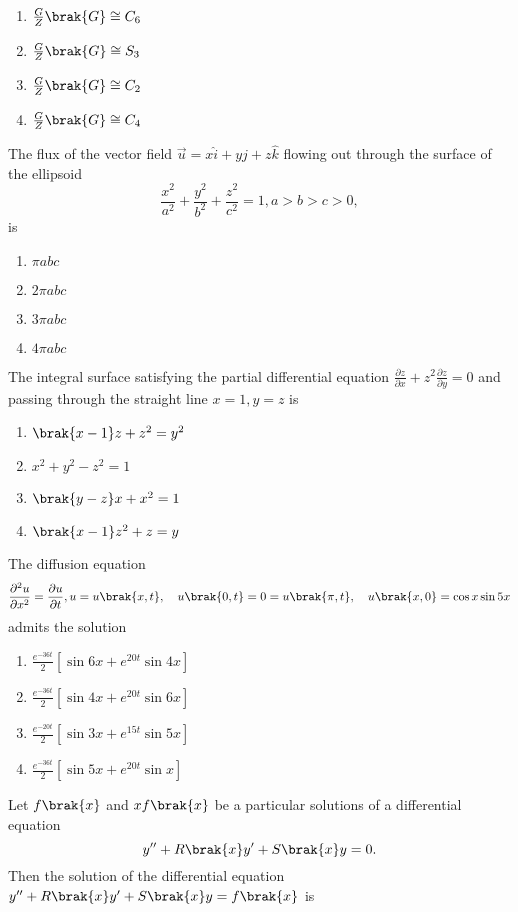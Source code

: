     \begin{enumerate}
        \item $\frac{G}{Z}\brak{G}\cong C_6$
         \item $\frac{G}{Z}\brak{G}\cong S_3$
          \item $\frac{G}{Z}\brak{G}\cong C_2$
          \item $\frac{G}{Z}\brak{G}\cong C_4$ 
    \end{enumerate}
    \item The flux of the vector field $\vec{u}=x\hat{i}+y\hat{j}+z\hat{k}$ flowing out through the surface of the ellipsoid $$\frac{x^2}{a^2}+\frac{y^2}{b^2}+\frac{z^2}{c^2}=1,a>b>c>0,$$ is
    \begin{enumerate}
        \item $\pi abc$
        \item $2\pi abc$
        \item $3\pi abc$
        \item $4\pi abc$
    \end{enumerate}
    \item The integral surface satisfying the partial differential equation  $\frac{\partial z}{\partial x}+z^2\frac{\partial z}{\partial y}=0$ and passing through the straight line $x=1,y=z$ is
    \begin{enumerate}
        \item $\brak{x-1}z+z^2=y^2$
        \item $x^2+y^2-z^2=1$
        \item $\brak{y-z}x+x^2=1$
        \item $\brak{x-1}z^2+z=y$
    \end{enumerate}
\item The diffusion equation $$\frac{\partial^2 u}{\partial x^2}=\frac{\partial u}{\partial t}, u=u\brak{x,t},\quad u\brak{0,t}=0=u\brak{\pi,t}, \quad u\brak{x,0}=\cos x\sin 5x$$ admits the solution
\begin{enumerate}
    \item $\frac{e^{-36t}}{2}[\sin 6x+e^{20t}\sin 4x]$
    \item $\frac{e^{-36t}}{2}[\sin 4x+e^{20t}\sin 6x]$
    \item $\frac{e^{-20t}}{2}[\sin 3x+e^{15t}\sin 5x]$
    \item $\frac{e^{-36t}}{2}[\sin 5x+e^{20t}\sin x]$
\end{enumerate}
    \item Let $f\brak{x}$ and $xf\brak{x}$ be a particular solutions of a differential equation $$y''+R\brak{x}y^{\prime}+S\brak{x}y=0.$$ Then the solution of the differential equation $y''+R\brak{x}y^{\prime}+S\brak{x}y=f\brak{x}$ is
